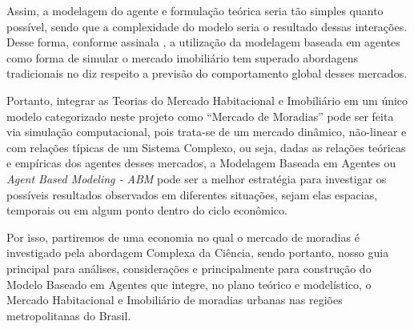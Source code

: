 Assim, a modelagem do agente e formulação teórica seria tão simples quanto possível, sendo que a complexidade do modelo seria o resultado dessas interações. Desse forma, conforme assinala , a utilização da modelagem baseada em agentes como forma de simular o mercado imobiliário tem superado abordagens tradicionais no diz respeito a previsão do comportamento global desses mercados.

Portanto, integrar as Teorias do Mercado Habitacional e Imobiliário em um único modelo categorizado neste projeto como \enquote{Mercado de Moradias} pode ser feita via simulação computacional, pois trata-se de um mercado dinâmico, não-linear e com relações típicas de um Sistema Complexo, ou seja, dadas as relações teóricas e empíricas dos agentes desses mercados, a Modelagem Baseada em Agentes ou \textit{Agent Based Modeling - ABM} pode ser a melhor estratégia para investigar os possíveis resultados observados em diferentes situações, sejam elas espacias, temporais ou em algum ponto dentro do ciclo econômico.

Por isso, partiremos de uma economia no qual o mercado de moradias é investigado pela abordagem Complexa da Ciência, sendo portanto, nosso guia principal para análises, considerações e principalmente para construção do Modelo Baseado em Agentes que integre, no plano teórico e modelístico, o Mercado Habitacional e Imobiliário de moradias urbanas nas regiões metropolitanas do Brasil.

